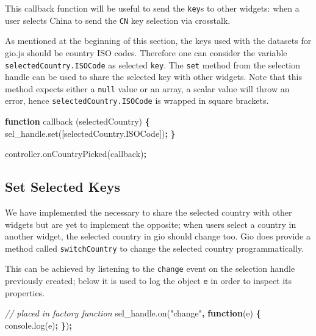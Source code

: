 \documentclass[10pt,]{krantz}
\makeatletter
\newenvironment{Shaded}{\begin{snugshade}}{\end{snugshade}}
\newcommand{\AttributeTok}[1]{\textcolor[rgb]{0.61,0.61,0.61}{#1}}
\newcommand{\CommentTok}[1]{\textcolor[rgb]{0.37,0.37,0.37}{\textit{#1}}}
\newcommand{\KeywordTok}[1]{\textcolor[rgb]{0.27,0.27,0.27}{\textbf{#1}}}
\newcommand{\NormalTok}[1]{#1}
\newcommand{\OperatorTok}[1]{\textcolor[rgb]{0.43,0.43,0.43}{\textbf{#1}}}
\newcommand{\StringTok}[1]{\textcolor[rgb]{0.5,0.5,0.5}{#1}}
\newcommand{\VariableTok}[1]{\textcolor[rgb]{0,0,0}{#1}}
\newenvironment{kframe}{%
\medskip{}
\setlength{\fboxsep}{.8em}
 \def\at@end@of@kframe{}%
 \ifinner\ifhmode%
  \def\at@end@of@kframe{\end{minipage}}%
  \begin{minipage}{\columnwidth}%
 \fi\fi%
 \def\FrameCommand##1{\hskip\@totalleftmargin \hskip-\fboxsep
 \colorbox{shadecolor}{##1}\hskip-\fboxsep
     \hskip-\linewidth \hskip-\@totalleftmargin \hskip\columnwidth}%
 \MakeFramed {\advance\hsize-\width
   \@totalleftmargin\z@ \linewidth\hsize
   \@setminipage}}%
 {\par\unskip\endMakeFramed%
 \at@end@of@kframe}
\renewenvironment{Shaded}{\begin{kframe}}{\end{kframe}}
\makeatother
\begin{document}
This callback function will be useful to send the \texttt{key}s to other widgets: when a user selects China to send the \texttt{CN} key selection via crosstalk.

As mentioned at the beginning of this section, the keys used with the datasets for gio.js should be country ISO codes. Therefore one can consider the variable \texttt{selectedCountry.ISOCode} as selected \texttt{key}. The \texttt{set} method from the selection handle can be used to share the selected key with other widgets. Note that this method expects either a \texttt{null} value or an array, a scalar value will throw an error, hence \texttt{selectedCountry.ISOCode} is wrapped in square brackets.

\begin{Shaded}
\begin{Highlighting}[]
\KeywordTok{function} \AttributeTok{callback}\NormalTok{ (selectedCountry) }\OperatorTok{\{}
  \VariableTok{sel_handle}\NormalTok{.}\AttributeTok{set}\NormalTok{([}\VariableTok{selectedCountry}\NormalTok{.}\AttributeTok{ISOCode}\NormalTok{])}\OperatorTok{;}
\OperatorTok{\}}

\VariableTok{controller}\NormalTok{.}\AttributeTok{onCountryPicked}\NormalTok{(callback)}\OperatorTok{;}
\end{Highlighting}
\end{Shaded}

\hypertarget{linking-widgets-set-keys}{%
\subsection{Set Selected Keys}\label{linking-widgets-set-keys}}

We have implemented the necessary to share the selected country with other widgets but are yet to implement the opposite; when users select a country in another widget, the selected country in gio should change too. Gio does provide a method called \texttt{switchCountry} to change the selected country programmatically.

This can be achieved by listening to the \texttt{change} event on the selection handle previously created; below it is used to log the object \texttt{e} in order to inspect its properties.

\begin{Shaded}
\begin{Highlighting}[]
\CommentTok{// placed in factory function}
\VariableTok{sel_handle}\NormalTok{.}\AttributeTok{on}\NormalTok{(}\StringTok{"change"}\OperatorTok{,} \KeywordTok{function}\NormalTok{(e) }\OperatorTok{\{}
  \VariableTok{console}\NormalTok{.}\AttributeTok{log}\NormalTok{(e)}\OperatorTok{;}
\OperatorTok{\}}\NormalTok{)}\OperatorTok{;}
\end{Highlighting}
\end{Shaded}
\end{document}
